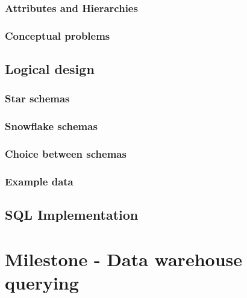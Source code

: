         \subsection{Attributes and Hierarchies} \label{sub:ml1_attributes}
        
        \subsection{Conceptual problems} \label{sub:ml1_problems}
        
        \clearpage

    \section{Logical design} 
            \label{sec:ml1_logical}
        \subsection{Star schemas} \label{sub:ml1_star}
        
        \clearpage
        \subsection{Snowflake schemas} \label{sub:ml1_snowflake}
        
        \subsection{Choice between schemas} \label{sub:ml1_choice}
        
        \clearpage %
        \subsection{Example data} \label{sub:ml1_example}
        
        \clearpage

    \section{SQL Implementation} %
    \label{sec:implementation}
    


\chapter{Milestone - Data warehouse querying} \label{cha:ml2}
